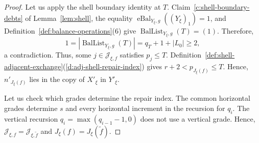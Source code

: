 \begin{proof}
Let us apply the shell boundary identity at $T$.
Claim~\ref{c:shell-boundary-debts} of Lemma~\ref{lem:shell}, the equality $\operatorname{eBal}_{Y_\xi,g}((Y_\xi)_1)=1$, and Definition~\ref{def:balance-operations}(6) give $\operatorname{BalList}_{Y_\xi,g}(T)=(1)$.
Therefore,
\[
 1=|\operatorname{BalList}_{Y_\xi,g}(T)|
 =q_T+1+|L_0|\ge2,
\]
a contradiction.
Thus, some $j\in\mathcal J_{\xi,f}$ satisfies $p_j\le T$.
Definition~\ref{def:shell-adjacent-exchange}(\ref{d:adj-shell-repair-index}) gives $r+2<p_{J_\xi(f)}\le T$.
Hence, $n'_{J_\xi(f)}$ lies in the copy of $X'_\xi$ in $Y'_\xi$.

 Let us check which grades determine the repair index.
The common horizontal grades determine $s$ and every horizontal increment in the recursion for $q_i$.
The vertical recursion $q_i=\max(q_{i-1}-1,0)$ does not use a vertical grade.
Hence, $\mathcal J_{\xi,f}=\mathcal J_{\xi,\widetilde f}$ and $J_\xi(f)=J_\xi(\widetilde f)$.
\end{proof}

